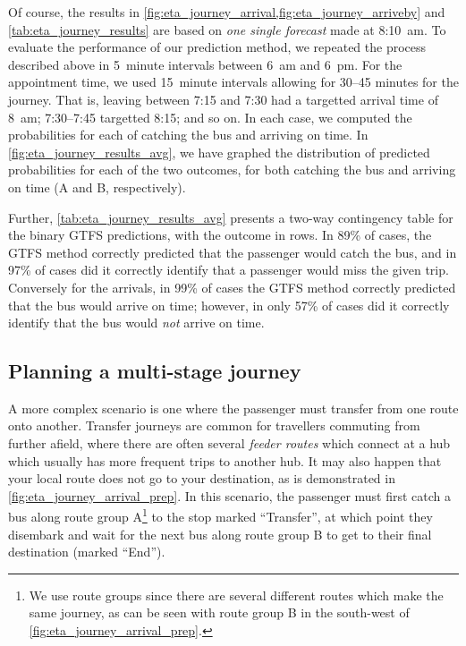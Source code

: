 Of course, the results in \cref{fig:eta_journey_arrival,fig:eta_journey_arriveby} and \cref{tab:eta_journey_results} are based on \emph{one single forecast} made at 8:10~am. To evaluate the performance of our prediction method, we repeated the process described above in 5~minute intervals between 6~am and 6~pm. For the appointment time, we used 15~minute intervals allowing for 30--45 minutes for the journey. That is, leaving between 7:15 and 7:30 had a targetted arrival time of 8~am; 7:30--7:45 targetted 8:15; and so on. In each case, we computed the probabilities for each of catching the bus and arriving on time. In \cref{fig:eta_journey_results_avg}, we have graphed the distribution of predicted probabilities for each of the two outcomes, for both catching the bus and arriving on time (A and B, respectively).

Further, \cref{tab:eta_journey_results_avg} presents a two-way contingency table for the binary GTFS predictions, with the outcome in rows. In 89\% of cases, the GTFS method correctly predicted that the passenger would catch the bus, and in 97\% of cases did it correctly identify that a passenger would miss the given trip. Conversely for the arrivals, in 99\% of cases the GTFS method correctly predicted that the bus would arrive on time; however, in only 57\% of cases did it correctly identify that the bus would \emph{not} arrive on time.


\subsection{Planning a multi-stage journey}
\label{sec:journey_transfer}

A more complex scenario is one where the passenger must transfer from one route onto another. Transfer journeys are common for travellers commuting from further afield, where there are often several \emph{feeder routes} which connect at a hub which usually has more frequent trips to another hub. It may also happen that your local route does not go to your destination, as is demonstrated in \cref{fig:eta_journey_arrival_prep}. In this scenario, the passenger must first catch a bus along route group A\footnote{We use route groups since there are several different routes which make the same journey, as can be seen with route group B in the south-west of \cref{fig:eta_journey_arrival_prep}.} to the stop marked ``Transfer'', at which point they disembark and wait for the next bus along route group B to get to their final destination (marked ``End'').



